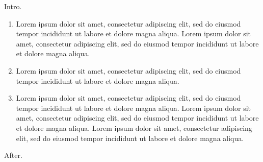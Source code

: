 \documentclass[11pt]{article}
\begin{document}
Intro.
\begin{enumerate}
\item Lorem ipsum dolor sit amet, consectetur adipiscing elit, sed do eiusmod tempor incididunt ut labore et dolore magna aliqua. Lorem ipsum dolor sit amet, consectetur adipiscing elit, sed do eiusmod tempor incididunt ut labore et dolore magna aliqua.
\item Lorem ipsum dolor sit amet, consectetur adipiscing elit, sed do eiusmod tempor incididunt ut labore et dolore magna aliqua.
\item Lorem ipsum dolor sit amet, consectetur adipiscing elit, sed do eiusmod tempor incididunt ut labore et dolore magna aliqua. Lorem ipsum dolor sit amet, consectetur adipiscing elit, sed do eiusmod tempor incididunt ut labore et dolore magna aliqua. Lorem ipsum dolor sit amet, consectetur adipiscing elit, sed do eiusmod tempor incididunt ut labore et dolore magna aliqua.
\end{enumerate}
After.
\end{document}
